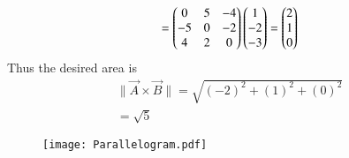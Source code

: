 \documentclass[journal,12pt,twocolumn]{IEEEtran}
\renewcommand\thesection{\arabic{section}}
\begin{document}
\begin{enumerate}[label=\thesection.\arabic*.,ref=\thesection.\theenumi]
\begin{enumerate}
\begin{align}
       =\begin{pmatrix}0&5&-4\\-5&0&-2\\4&2&0\end{pmatrix}\begin{pmatrix}1\\-2\\-3\end{pmatrix}=\begin{pmatrix}2\\1\\0\end{pmatrix}
   \end{align}
   Thus the desired area is 
   \begin{align}
       \|\vec{A}\times\vec{B}\|=\sqrt{(-2)^2+(1)^2+(0)^2}\\
       =\sqrt{5}
   \end{align}
\begin{figure}[h]
\centering
\texttt{[image: Parallelogram.pdf]}
\label{Fig 1.2}
\end{figure}
\end{enumerate}
\end{enumerate}
\end{document}
